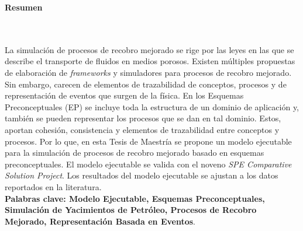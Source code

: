 \newpage{\pagestyle{empty}\cleardoublepage}

\newpage
\textbf{\LARGE Resumen}
\\\\

La simulación de procesos de recobro mejorado se rige por las leyes en las que se describe el transporte de fluidos en medios porosos. Existen múltiples propuestas de elaboración de \textit{frameworks} y simuladores para procesos de recobro mejorado. Sin embargo, carecen de elementos de trazabilidad de conceptos, procesos y de representación de eventos que surgen de la física. En los Esquemas Preconceptuales (EP) se incluye toda la estructura de un dominio de aplicación y, también se pueden representar los procesos que se dan en tal dominio. Estos, aportan cohesión, consistencia y elementos de trazabilidad entre conceptos y procesos. Por lo que, en esta Tesis de Maestría se propone un modelo ejecutable para la simulación de procesos de recobro mejorado basado en esquemas preconceptuales. El modelo ejecutable se valida con el noveno \textit{SPE Comparative Solution Project}. Los resultados del modelo ejecutable se ajustan a los datos reportados en la literatura. \\


\textbf{\small Palabras clave: Modelo Ejecutable, Esquemas Preconceptuales, Simulación de Yacimientos de Petróleo, Procesos de Recobro Mejorado, Representación Basada en Eventos}.\\




